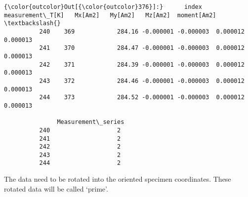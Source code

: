 \documentclass{article}
\begin{document}
            \begin{Verbatim}[commandchars=\\\{\}]
{\color{outcolor}Out[{\color{outcolor}376}]:}      index  measurement\_T[K]   Mx[Am2]   My[Am2]   Mz[Am2]  moment[Am2]  \textbackslash{}
          240    369            284.16 -0.000001 -0.000003  0.000012     0.000013   
          241    370            284.47 -0.000001 -0.000003  0.000012     0.000013   
          242    371            284.39 -0.000001 -0.000003  0.000012     0.000013   
          243    372            284.46 -0.000001 -0.000003  0.000012     0.000013   
          244    373            284.52 -0.000001 -0.000003  0.000012     0.000013   
          
               Measurement\_series  
          240                   2  
          241                   2  
          242                   2  
          243                   2  
          244                   2  
\end{Verbatim}
        
    The data need to be rotated into the oriented specimen coordinates.
These rotated data will be called `prime'.
\end{document}

